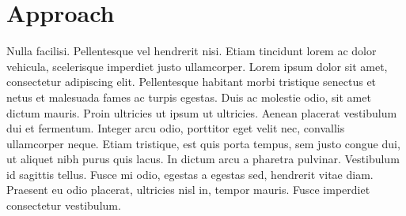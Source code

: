 \section*{Approach}
Nulla facilisi. Pellentesque vel hendrerit nisi. Etiam tincidunt lorem ac dolor vehicula, scelerisque imperdiet justo ullamcorper. Lorem ipsum dolor sit amet, consectetur adipiscing elit. Pellentesque habitant morbi tristique senectus et netus et malesuada fames ac turpis egestas. Duis ac molestie odio, sit amet dictum mauris. Proin ultricies ut ipsum ut ultricies. Aenean placerat vestibulum dui et fermentum. Integer arcu odio, porttitor eget velit nec, convallis ullamcorper neque. Etiam tristique, est quis porta tempus, sem justo congue dui, ut aliquet nibh purus quis lacus. In dictum arcu a pharetra pulvinar. Vestibulum id sagittis tellus. Fusce mi odio, egestas a egestas sed, hendrerit vitae diam. Praesent eu odio placerat, ultricies nisl in, tempor mauris. Fusce imperdiet consectetur vestibulum. 